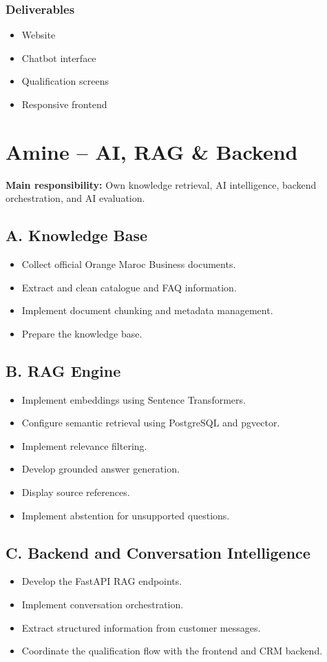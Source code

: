 \documentclass[11pt,a4paper]{article}
\begin{document}
\subsubsection*{Deliverables}
\begin{itemize}
  \item Website
  \item Chatbot interface
  \item Qualification screens
  \item Responsive frontend
\end{itemize}

\section{Amine -- AI, RAG \& Backend}

\textbf{Main responsibility:} Own knowledge retrieval, AI intelligence, backend orchestration, and AI evaluation.

\subsection*{A. Knowledge Base}
\begin{itemize}
  \item Collect official Orange Maroc Business documents.
  \item Extract and clean catalogue and FAQ information.
  \item Implement document chunking and metadata management.
  \item Prepare the knowledge base.
\end{itemize}

\subsection*{B. RAG Engine}
\begin{itemize}
  \item Implement embeddings using Sentence Transformers.
  \item Configure semantic retrieval using PostgreSQL and pgvector.
  \item Implement relevance filtering.
  \item Develop grounded answer generation.
  \item Display source references.
  \item Implement abstention for unsupported questions.
\end{itemize}

\subsection*{C. Backend and Conversation Intelligence}
\begin{itemize}
  \item Develop the FastAPI RAG endpoints.
  \item Implement conversation orchestration.
  \item Extract structured information from customer messages.
  \item Coordinate the qualification flow with the frontend and CRM backend.
\end{itemize}
\end{document}
